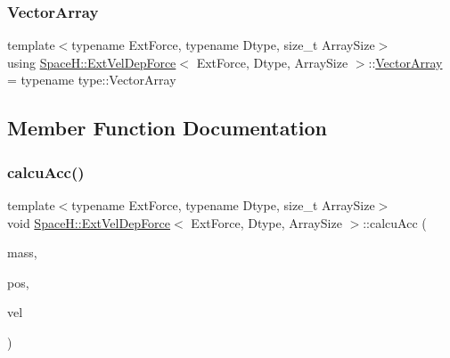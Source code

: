 \mbox{\label{struct_space_h_1_1_ext_vel_dep_force_ac2320cdd3fdaad369c901e79ded11d31}} 
\subsubsection{\texorpdfstring{Vector\+Array}{VectorArray}}
{\footnotesize\ttfamily template$<$typename Ext\+Force, typename Dtype, size\+\_\+t Array\+Size$>$ \\
using \mbox{\hyperlink{struct_space_h_1_1_ext_vel_dep_force}{Space\+H\+::\+Ext\+Vel\+Dep\+Force}}$<$ Ext\+Force, Dtype, Array\+Size $>$\+::\mbox{\hyperlink{struct_space_h_1_1_ext_vel_dep_force_ac2320cdd3fdaad369c901e79ded11d31}{Vector\+Array}} =  typename type\+::\+Vector\+Array}



\subsection{Member Function Documentation}
\mbox{\label{struct_space_h_1_1_ext_vel_dep_force_a58775894138f5ebd1d7d7460183f6c1e}} 
\subsubsection{\texorpdfstring{calcu\+Acc()}{calcuAcc()}}
{\footnotesize\ttfamily template$<$typename Ext\+Force, typename Dtype, size\+\_\+t Array\+Size$>$ \\
void \mbox{\hyperlink{struct_space_h_1_1_ext_vel_dep_force}{Space\+H\+::\+Ext\+Vel\+Dep\+Force}}$<$ Ext\+Force, Dtype, Array\+Size $>$\+::calcu\+Acc (\begin{DoxyParamCaption}\item[{const \mbox{\hyperlink{struct_space_h_1_1_ext_vel_dep_force_afb0d9418e7236855d8cd8ce883493c27}{Scalar\+Array}} \&}]{mass,  }\item[{const \mbox{\hyperlink{struct_space_h_1_1_ext_vel_dep_force_ac2320cdd3fdaad369c901e79ded11d31}{Vector\+Array}} \&}]{pos,  }\item[{const \mbox{\hyperlink{struct_space_h_1_1_ext_vel_dep_force_ac2320cdd3fdaad369c901e79ded11d31}{Vector\+Array}} \&}]{vel }\end{DoxyParamCaption})\hspace{0.3cm}{\ttfamily [inline]}}

